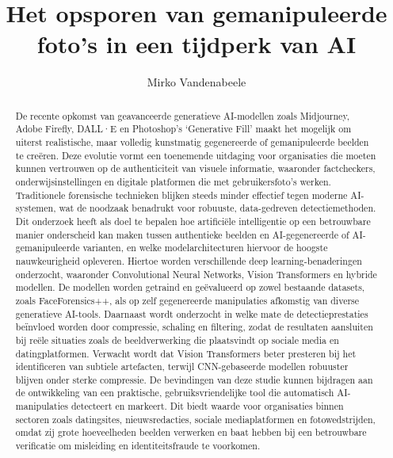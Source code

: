 \documentclass{hogent-article}
\title{Het opsporen van gemanipuleerde foto’s in een tijdperk van AI}
\author{Mirko Vandenabeele}
\begin{document}
\begin{abstract}
  De recente opkomst van geavanceerde generatieve AI-modellen zoals Midjourney, Adobe Firefly, DALL·E en Photoshop’s ‘Generative Fill’ maakt het mogelijk om uiterst realistische, maar volledig kunstmatig gegenereerde of gemanipuleerde beelden te creëren. Deze evolutie vormt een toenemende uitdaging voor organisaties die moeten kunnen vertrouwen op de authenticiteit van visuele informatie, waaronder factcheckers, onderwijsinstellingen en digitale platformen die met gebruikersfoto’s werken. Traditionele forensische technieken blijken steeds minder effectief tegen moderne AI-systemen, wat de noodzaak benadrukt voor robuuste, data-gedreven detectiemethoden. Dit onderzoek heeft als doel te bepalen hoe artificiële intelligentie op een betrouwbare manier onderscheid kan maken tussen authentieke beelden en AI-gegenereerde of AI-gemanipuleerde varianten, en welke modelarchitecturen hiervoor de hoogste nauwkeurigheid opleveren. Hiertoe worden verschillende deep learning-benaderingen onderzocht, waaronder Convolutional Neural Networks, Vision Transformers en hybride modellen. De modellen worden getraind en geëvalueerd op zowel bestaande datasets, zoals FaceForensics++, als op zelf gegenereerde manipulaties afkomstig van diverse generatieve AI-tools. Daarnaast wordt onderzocht in welke mate de detectieprestaties beïnvloed worden door compressie, schaling en filtering, zodat de resultaten aansluiten bij reële situaties zoals de beeldverwerking die plaatsvindt op sociale media en datingplatformen. Verwacht wordt dat Vision Transformers beter presteren bij het identificeren van subtiele artefacten, terwijl CNN-gebaseerde modellen robuuster blijven onder sterke compressie. De bevindingen van deze studie kunnen bijdragen aan de ontwikkeling van een praktische, gebruiksvriendelijke tool die automatisch AI-manipulaties detecteert en markeert. Dit biedt waarde voor organisaties binnen sectoren zoals datingsites, nieuwsredacties, sociale mediaplatformen en fotowedstrijden, omdat zij grote hoeveelheden beelden verwerken en baat hebben bij een betrouwbare verificatie om misleiding en identiteitsfraude te voorkomen.
\end{abstract}

\tableofcontents

\end{document}
